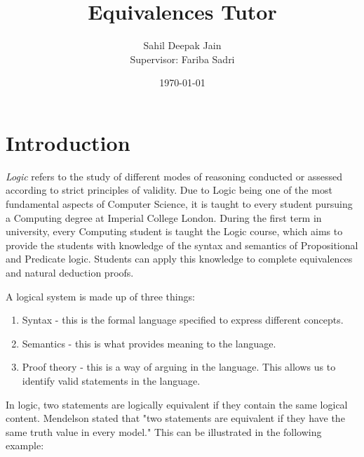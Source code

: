 \documentclass[11pt]{article}
\begin{document}
\title{Equivalences Tutor}

\author{Sahil Deepak Jain \\ Supervisor: Fariba Sadri}
\date{\today}

\maketitle
\newpage

\begin{abstract}

\end{abstract}
\newpage

\tableofcontents

\newpage

\section{Introduction}

\emph{Logic} refers to the study of different modes of reasoning conducted or 
assessed according to strict principles of validity. Due to Logic being one of 
the most fundamental aspects of Computer Science, it is taught to every student
pursuing a Computing degree at Imperial College London. During the first term 
in university, every Computing student is taught the Logic course, which aims to
provide the students with knowledge of the syntax and semantics of Propositional 
and Predicate logic. Students can apply this knowledge to complete equivalences
and natural deduction proofs.

A logical system is made up of three things:
\begin{enumerate}
  \item Syntax - this is the formal language specified to express different
         concepts.
  \item Semantics - this is what provides meaning to the language.
  \item Proof theory - this is a way of arguing in the language. This allows us
         to identify valid statements in the language.
\end{enumerate}

In logic, two statements are logically equivalent if they contain the same
logical content. Mendelson stated that "two statements are equivalent if they
have the same truth value in every model." This can be illustrated in the 
following example: \\ \bigskip 
\end{document}
